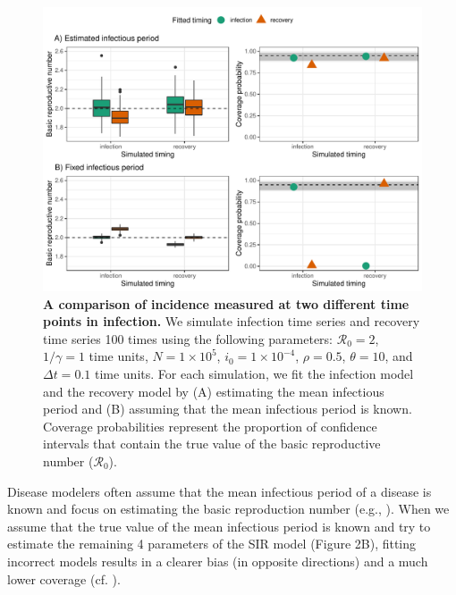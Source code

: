 \documentclass[12pt]{article}\usepackage[]{graphicx}\usepackage[]{color}
\begin{document}
\begin{figure}
\includegraphics[width=\textwidth]{compare_deterministic.pdf}
\caption{
\textbf{A comparison of incidence measured at two different time points in infection.}
We simulate infection time series and recovery time series 100 times using the 
following parameters:  
$\mathcal R_0 = 2$, $1/\gamma = 1$ time units, $N = 1 \times 10^5$, $i_0 = 1 \times 10^{-4}$,
$\rho = 0.5$, $\theta = 10$, and $\Delta t = 0.1$ time units.
For each simulation, we fit the infection model and the recovery model by
(A) estimating the mean infectious period and (B) assuming
that the mean infectious period is known.
Coverage probabilities represent the proportion of confidence intervals
that contain the true value of the basic reproductive number ($\mathcal R_0$).
}
\end{figure}

Disease modelers often assume that the mean infectious period of a disease
is known and focus on estimating the basic reproduction number (e.g.,
\cite{hooker2010parameterizing, lin2016seasonality, pons2018serotype}). 
When we assume that the true value of the mean infectious period is known
and try to estimate the remaining 4 parameters of the SIR model (Figure 2B), fitting
incorrect models results in a clearer bias (in opposite directions)
and a much lower coverage (cf. \cite{elderd2006uncertainty}).
\end{document}
